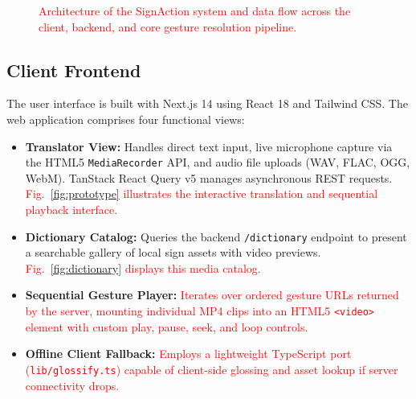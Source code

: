 \documentclass[conference,a4paper,10pt]{IEEEtran}
\begin{document}
\begin{figure}[t]
{%
}
\caption{\textcolor{red}{Architecture of the SignAction system and data flow across the client, backend, and core gesture resolution pipeline.}}
\label{fig:architecture}
\end{figure}

\subsection{Client Frontend}

The user interface is built with Next.js 14 using React 18 and Tailwind CSS. The web application comprises four functional views:
\begin{itemize}
    \item \textbf{Translator View:} Handles direct text input, live microphone capture via the HTML5 \texttt{MediaRecorder} API, and audio file uploads (WAV, FLAC, OGG, WebM). TanStack React Query v5 manages asynchronous REST requests. \textcolor{red}{Fig.~\ref{fig:prototype} illustrates the interactive translation and sequential playback interface.}
    \item \textbf{Dictionary Catalog:} Queries the backend \texttt{/dictionary} endpoint to present a searchable gallery of local sign assets with video previews. \textcolor{red}{Fig.~\ref{fig:dictionary} displays this media catalog.}
    \item \textbf{Sequential Gesture Player:} \textcolor{red}{Iterates over ordered gesture URLs returned by the server, mounting individual MP4 clips into an HTML5 \texttt{<video>} element with custom play, pause, seek, and loop controls.}
    \item \textbf{Offline Client Fallback:} \textcolor{red}{Employs a lightweight TypeScript port (\texttt{lib/glossify.ts}) capable of client-side glossing and asset lookup if server connectivity drops.}
\end{itemize}
\end{document}
